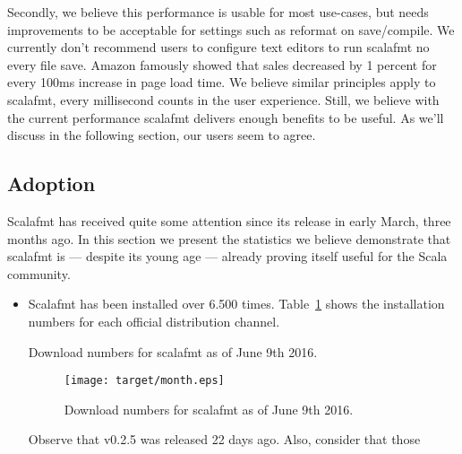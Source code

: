 Secondly, we believe this performance is usable for most use-cases, but needs improvements to be acceptable for settings such as reformat on save/compile.
We currently don't recommend users to configure text editors to run scalafmt no every file save.
Amazon famously showed that sales decreased by 1 percent for every 100ms increase in page load time\autocite{kohavi2007online}.
We believe similar principles apply to scalafmt, every millisecond counts in the user experience.
Still, we believe with the current performance scalafmt delivers enough benefits to be useful.
As we'll discuss in the following section, our users seem to agree.

\subsection{Adoption}\label{sec:adoption}
Scalafmt has received quite some attention since its release in early March, three months ago.
In this section we present the statistics we believe demonstrate that scalafmt is --- despite its young age --- already proving itself useful for the Scala community.

\begin{itemize}
  \item Scalafmt has been installed over 6.500 times.
    Table~\ref{tab:installs} shows the installation numbers for each official distribution channel.
    \begin{table}
      \centering
      
      \caption{Download numbers for scalafmt as of June 9th 2016.}\label{tab:installs}
    \end{table}
    \begin{figure}
      \centering
      \texttt{[image: target/month.eps]}
      \caption{Download numbers for scalafmt as of June 9th 2016.}\label{tab:installs}
    \end{figure}
    Observe that v0.2.5 was released 22 days ago.
    Also, consider that those
\end{itemize}




